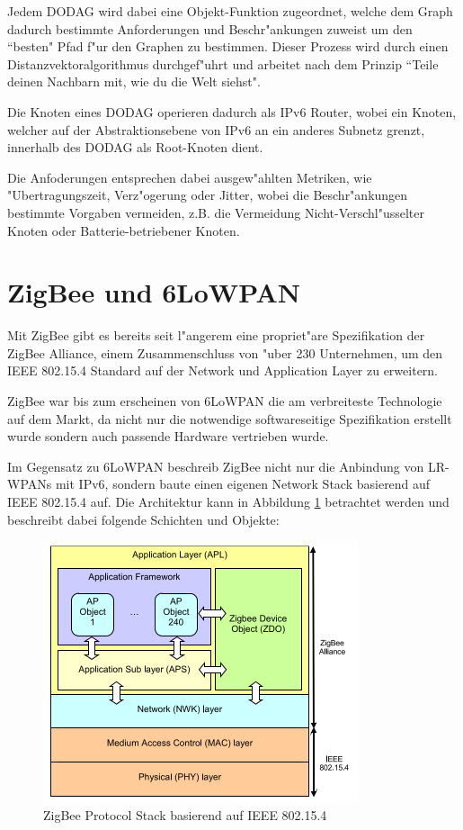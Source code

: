 \documentclass[final]{lktseminar}
\begin{document}
Jedem DODAG wird dabei eine Objekt-Funktion zugeordnet, welche dem Graph dadurch
bestimmte Anforderungen und Beschr"ankungen zuweist um den ``besten" Pfad f"ur den
Graphen zu bestimmen. Dieser Prozess wird durch einen Distanzvektoralgorithmus durchgef"uhrt
und arbeitet nach dem Prinzip ``Teile deinen Nachbarn mit, wie du die Welt siehst"\cite{rplwiki}.

Die Knoten eines DODAG operieren dadurch als IPv6 Router, wobei ein Knoten, welcher auf der
Abstraktionsebene von IPv6 an ein anderes Subnetz grenzt, innerhalb des DODAG als Root-Knoten
dient.

Die Anfoderungen entsprechen dabei ausgew"ahlten Metriken, wie "Ubertragungszeit, Verz"ogerung oder Jitter,
wobei die Beschr"ankungen bestimmte Vorgaben vermeiden, z.B. die Vermeidung Nicht-Verschl"usselter Knoten oder
Batterie-betriebener Knoten.






\section{ZigBee und 6LoWPAN}
\label{sec: ZigBee und 6LoWPAN}

Mit ZigBee gibt es bereits seit l"angerem eine propriet"are Spezifikation der
ZigBee Alliance, einem Zusammenschluss von "uber 230 Unternehmen, um den IEEE 802.15.4
Standard auf der Network und Application Layer zu erweitern.

ZigBee war bis zum erscheinen von 6LoWPAN die am verbreiteste Technologie auf dem Markt,
da nicht nur die notwendige softwareseitige Spezifikation erstellt wurde sondern auch
passende Hardware vertrieben wurde.

Im Gegensatz zu 6LoWPAN beschreib ZigBee nicht nur die Anbindung von LR-WPANs mit IPv6,
 sondern baute einen eigenen Network Stack basierend auf IEEE 802.15.4 auf. Die
 Architektur kann in Abbildung \ref{fig:zigbee_protocol_stack} betrachtet werden und beschreibt
 dabei folgende Schichten und Objekte:

\begin{figure}[h]
    \centering
    \includegraphics{zigbee_stack.png}
    \caption{ZigBee Protocol Stack basierend auf IEEE 802.15.4 \cite{zigbee_stack_picture}}
    \label{fig:zigbee_protocol_stack}
\end{figure}
\end{document}

